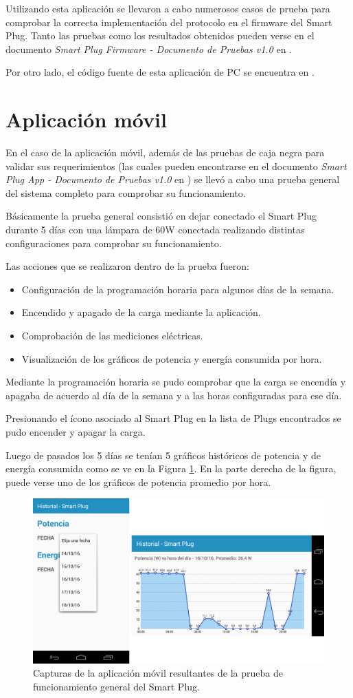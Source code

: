 Utilizando esta aplicación se llevaron a cabo numerosos casos de prueba para comprobar la correcta implementación del protocolo en el firmware del Smart Plug. Tanto las pruebas como los resultados obtenidos pueden verse en el documento \textit{Smart Plug Firmware - Documento de Pruebas v1.0} en \citep{repo_docu_firmware}.

Por otro lado, el código fuente de esta aplicación de PC se encuentra en \citep{repo_simulador_tcp}.


\section{Aplicación móvil}

En el caso de la aplicación móvil, además de las pruebas de caja negra para validar sus requerimientos (las cuales pueden encontrarse en el documento \textit{Smart Plug App - Documento de Pruebas v1.0} en \citep{repo_docu_app}) se llevó a cabo una prueba general del sistema completo para comprobar su funcionamiento.

Básicamente la prueba general consistió en dejar conectado el Smart Plug durante 5 días con una lámpara de 60W conectada realizando distintas configuraciones para comprobar su funcionamiento.

Las acciones que se realizaron dentro de la prueba fueron:

\begin{itemize}
\item Configuración de la programación horaria para algunos días de la semana.
\item Encendido y apagado de la carga mediante la aplicación.
\item Comprobación de las mediciones eléctricas.
\item Visualización de los gráficos de potencia y energía consumida por hora.
\end{itemize}

Mediante la programación horaria se pudo comprobar que la carga se encendía y apagaba de acuerdo al día de la semana y a las horas configuradas para ese día.

Presionando el ícono asociado al Smart Plug en la lista de Plugs encontrados se pudo encender y apagar la carga.

Luego de pasados los 5 días se tenían 5 gráficos históricos de potencia y de energía consumida como se ve en la Figura \ref{fig:integracion}. En la parte derecha de la figura, puede verse uno de los gráficos de potencia promedio por hora.


\begin{figure}[h]
	\centering
	\includegraphics[width=12cm]{./Figures/4_1_3_integracion.png}
	\caption{Capturas de la aplicación móvil resultantes de la prueba de funcionamiento general del Smart Plug.}
	\label{fig:integracion}
\end{figure}